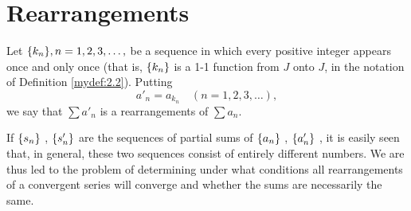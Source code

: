 \section{Rearrangements}
\begin{mydef}
    \label{mydef:3.52}
    Let $\protect\{k_n\}, n=1,2,3,\dots,$ be a sequence in which every positive integer appears once and only once 
    (that is, $\protect\{k_n\}$ is a 1-1 function from $J$ onto $J$, in the notation of Definition \ref{mydef:2.2}).
    Putting
    \begin{equation*}
        a'_n = a_{k_n} \quad (n = 1,2,3,\dots),
    \end{equation*}
    we say that $\sum a'_n$ is a rearrangements of $\sum a_n$.
\end{mydef}

If 
$\protect\{s_n\}$ ,
$\protect\{s'_n\}$ 
are the sequences of partial sums of 
$\protect\{a_n\}$ ,
$\protect\{a'_n\}$ ,
it is easily seen that, in general,
these two sequences consist of entirely different numbers.
We are thus led to the problem of determining under what conditions all rearrangements of a convergent series will converge and whether the sums are necessarily the same.

